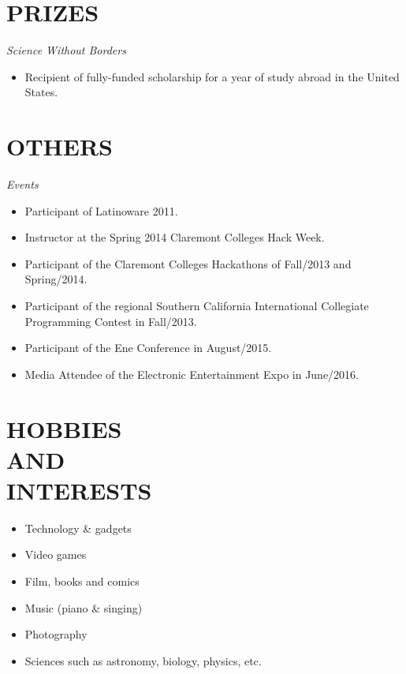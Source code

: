 \documentclass[margin]{res}
\begin{document}
\begin{resume}
		\section{PRIZES}
			{\sl Science Without Borders}
			\begin{itemize}
				\item[] Recipient of fully-funded scholarship for a year of study abroad in the United States.
			\end{itemize}

		\section{OTHERS}
			{\sl Events}
			\begin{itemize}
				\item[] Participant of Latinoware 2011.
				\item[] Instructor at the Spring 2014 Claremont Colleges Hack Week.
				\item[] Participant of the Claremont Colleges Hackathons of Fall/2013 and Spring/2014.
				\item[] Participant of the regional Southern California International Collegiate Programming Contest in Fall/2013.
				\item[] Participant of the Ene Conference in August/2015.
				\item[] Media Attendee of the Electronic Entertainment Expo in June/2016.
			\end{itemize}

		\section{HOBBIES \\ AND \\ INTERESTS}
			\begin{itemize}
				\itemsep -2pt
		    	\item Technology \& gadgets
				\item Video games
				\item Film, books and comics
				\item Music (piano \& singing)
				\item Photography
				\item Sciences such as astronomy, biology, physics, etc.
			\end{itemize}
	\end{resume}
\end{document}
